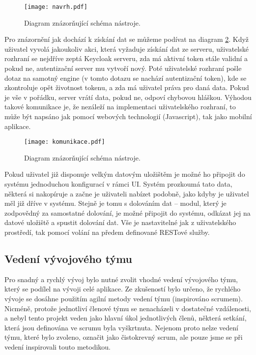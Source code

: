 \begin{figure}[!htp]
\centering
\texttt{[image: navrh.pdf]}
\caption{Diagram znázorňující schéma nástroje.}
\label{schema}
\end{figure}

\par Pro znázornění jak dochází k získání dat se můžeme podívat na diagram \ref{komunikace}. Když uživatel vyvolá jakoukoliv akci, která vyžaduje získání dat ze serveru, uživatelské rozhraní se nejdříve zeptá Keycloak serveru, zda má aktivní token stále validní a pokud ne, autentizační server mu vytvoří nový. Poté uživatelské rozhraní pošle dotaz na samotný engine (v tomto dotazu se nachází autentizační token), kde se zkontroluje opět životnost tokenu, a zda má uživatel práva pro daná data. Pokud je vše v pořádku, server vrátí data, pokud ne, odpoví chybovou hláškou. Výhodou takové komunikace je, že nezáleží na implementaci uživatelského rozhraní, to může být napsáno jak pomocí webových technologií (Javascript), tak jako mobilní aplikace.

\begin{figure}[htp]
\centering
\texttt{[image: komunikace.pdf]}
\caption{Diagram znázorňující schéma nástroje.}
\label{komunikace}
\end{figure}

\par Pokud uživatel již disponuje velkým datovým uložištěm je možné ho připojit do systému jednoduchou konfigurací v rámci UI. Systém prozkoumá tato data, některá si nakopíruje a začne je uživateli nabízet podobně, jako kdyby je uživatel měl již dříve v systému. Stejně je tomu s dolováním dat -- modul, který je zodpovědný za samostatné dolování, je možné připojit do systému, odkázat jej na datové uložiště a spustit dolování dat. Vše je nastavitelné jak z uživatelského prostředí, tak pomocí volání na předem definované RESTové služby.

\subsection{Vedení vývojového týmu}
\par Pro snadný a rychlý vývoj bylo nutné zvolit vhodné vedení vývojového týmu, který se podílel na vývoji celé aplikace. Ze zkušeností bylo určeno, že rychlého vývoje se dosáhne použitím agilní metody vedení týmu (inspirováno scrumem). Nicméně, protože jednotliví členové týmu se nenacházeli v dostatečné vzdálenosti, a nebyl tento projekt veden jako hlavní úkol jednotlivých členů, některá setkání, která jsou definována ve scrumu byla vyškrtnuta. Nejenom proto nelze vedení týmu, které bylo zvoleno, označit jako čistokrevný scrum, ale pouze jsme se při vedení inspirovali touto metodikou.


